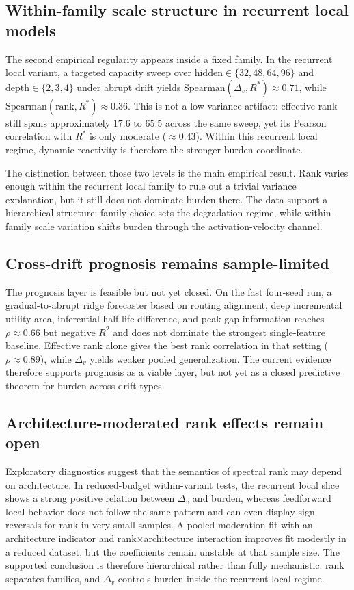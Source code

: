 \subsection*{Within-family scale structure in recurrent local models}

The second empirical regularity appears inside a fixed family. In the recurrent
local variant, a targeted capacity sweep over
$\mathrm{hidden} \in \{32,48,64,96\}$ and
$\mathrm{depth} \in \{2,3,4\}$ under abrupt drift yields
$\mathrm{Spearman}(\Delta_v,R^*) \approx 0.71$, while
$\mathrm{Spearman}(\mathrm{rank},R^*) \approx 0.36$. This is not a
low-variance artifact: effective rank still spans approximately $17.6$ to
$65.5$ across the same sweep, yet its Pearson correlation with $R^*$ is only
moderate ($\approx 0.43$). Within this recurrent local regime, dynamic
reactivity is therefore the stronger burden coordinate.

The distinction between those two levels is the main empirical result. Rank
varies enough within the recurrent local family to rule out a trivial variance
explanation, but it still does not dominate burden there. The data support a
hierarchical structure: family choice sets the degradation regime, while
within-family scale variation shifts burden through the activation-velocity
channel.

\subsection*{Cross-drift prognosis remains sample-limited}

The prognosis layer is feasible but not yet closed. On the fast four-seed run, a
gradual-to-abrupt ridge forecaster based on routing alignment, deep incremental
utility area, inferential half-life difference, and peak-gap information reaches
$\rho \approx 0.66$ but negative $R^2$ and does not dominate the strongest
single-feature baseline. Effective rank alone gives the best rank correlation in
that setting ($\rho \approx 0.89$), while $\Delta_v$ yields weaker pooled
generalization. The current evidence therefore supports prognosis as a viable
layer, but not yet as a closed predictive theorem for burden across drift types.

\subsection*{Architecture-moderated rank effects remain open}

Exploratory diagnostics suggest that the semantics of spectral rank may depend on
architecture. In reduced-budget within-variant tests, the recurrent local slice
shows a strong positive relation between $\Delta_v$ and burden, whereas
feedforward local behavior does not follow the same pattern and can even display
sign reversals for rank in very small samples. A pooled moderation fit with an
architecture indicator and rank$\times$architecture interaction improves fit
modestly in a reduced dataset, but the coefficients remain unstable at that
sample size. The supported conclusion is therefore hierarchical rather than fully
mechanistic: rank separates families, and $\Delta_v$ controls burden inside the
recurrent local regime.
